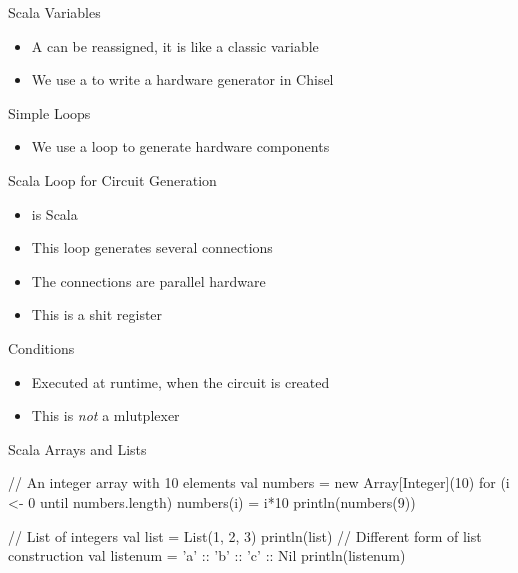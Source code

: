 \begin{frame}[fragile]{Scala Variables}
\begin{itemize}
\item A  can be reassigned, it is like a classic variable
\item We use a  to write a hardware generator in Chisel
\end{itemize}
\end{frame}

\begin{frame}[fragile]{Simple Loops}
\begin{itemize}
\item We use a loop to generate hardware components
\end{itemize}
\end{frame}

\begin{frame}[fragile]{Scala  Loop for Circuit Generation}
\begin{itemize}
\item {} is Scala
\item This loop generates several connections
\item The connections are parallel hardware
\item This is a shit register
\end{itemize}
\end{frame}

\begin{frame}[fragile]{Conditions}
\begin{itemize}
\item Executed at runtime, when the circuit is created
\item This is \emph{not} a mlutplexer
\end{itemize}
\end{frame}

\begin{frame}[fragile]{Scala Arrays and Lists}
\begin{chisel}
// An integer array with 10 elements
val numbers = new Array[Integer](10)
for (i <- 0 until numbers.length) {
  numbers(i) = i*10
}
println(numbers(9))


// List of integers
val list = List(1, 2, 3)
println(list)
// Different form of list construction
val listenum = 'a' :: 'b' :: 'c' :: Nil
println(listenum)
\end{chisel}
\end{frame}


